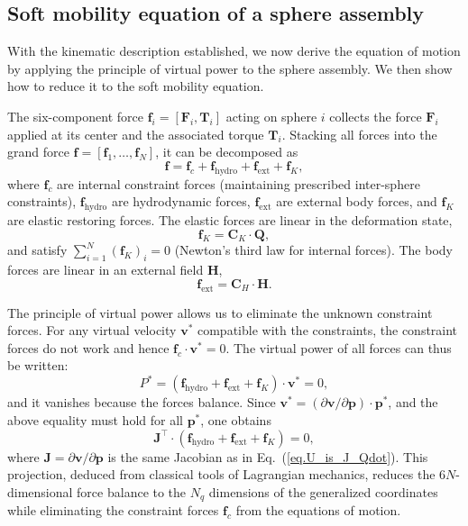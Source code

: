 \documentclass[aps,prfluids,groupedaddress]{revtex4-2}
\newcommand{\bff}{\bm{f}}
\newcommand{\bp}{\bm{p}}
\newcommand{\bv}{\bm{v}}
\newcommand{\bF}{\bm{F}}
\newcommand{\bH}{\bm{H}}
\newcommand{\bQ}{\bm{Q}}
\newcommand{\bT}{\bm{T}}
\newcommand{\tC}{\bm{{C}}}
\newcommand{\tJ}{\bm{J}}
\begin{document}
\subsection{Soft mobility equation of a sphere assembly}

With the kinematic description established, we now derive the equation of motion by applying the principle of virtual power to the sphere assembly. We then show how to reduce it to the soft mobility equation.

The six-component force $\bff_i = [\bF_i, \bT_i]$ acting on sphere $i$ collects the force $\bF_i$ applied at its center and the associated torque $\bT_i$. Stacking all forces into the  grand force $\bff = [\bff_1,\dots,\bff_N]$, it can be decomposed as
$$\bff = \bff_c + \bff_\mathrm{hydro} + \bff_\mathrm{ext} + \bff_K,$$
where $\bff_c$ are internal constraint forces (maintaining prescribed inter-sphere constraints), $\bff_\mathrm{hydro}$ are hydrodynamic forces, $\bff_\mathrm{ext}$ are external body forces, and $\bff_K$ are elastic restoring forces. The elastic forces are linear in the deformation state,
\begin{equation}\label{eq.linear_elasticity}
\bff_K = \tC_K \cdot \bQ,
\end{equation}
and satisfy $\sum_{i=1}^N (\bff_K)_i = 0$ (Newton's third law for internal forces). The body forces are linear in an external field $\bH$,
\begin{equation}\label{eq.body_force}
\bff_\mathrm{ext} = \tC_H \cdot \bH.
\end{equation}

The principle of virtual power allows us to eliminate the unknown constraint forces. For any virtual velocity $\bv^*$ compatible with the constraints, the constraint forces do not work and hence $\bff_c \cdot \bv^* = 0$. The virtual power of all forces can thus be written:
\begin{equation}
P^* = \left(\bff_\mathrm{hydro} + \bff_\mathrm{ext} + \bff_K\right) \cdot \bv^* = 0,
\end{equation}
and it vanishes because the forces balance. 
Since $\bv^* = (\partial \bv/\partial \bp)\cdot \bp^*$,
and the above equality must hold for all $\bp^*$, one obtains
\begin{equation}\label{eq.generalized_force_Q}
\tJ^\top \cdot \left(\bff_\mathrm{hydro} + \bff_\mathrm{ext} + \bff_K\right) = 0,
\end{equation}
where $\tJ = \partial \bv/\partial \bp$ is the same Jacobian as in Eq.~(\ref{eq.U_is_J_Qdot}). This projection, deduced from classical tools of Lagrangian mechanics, reduces the $6N$-dimensional force balance to the $N_q$ dimensions of the generalized coordinates while eliminating the constraint forces $\bff_c$ from the equations of motion.
\end{document}
